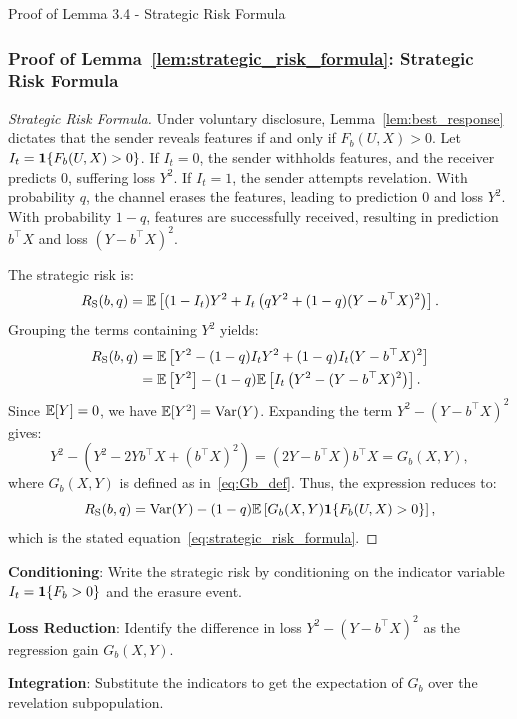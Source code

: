 \begin{sourceblock}{Proof of Lemma 3.4 - Strategic Risk Formula}
\subsubsection*{Proof of Lemma~\ref{lem:strategic_risk_formula}: Strategic Risk Formula}
\label{app:proof_strategic_risk}
\begin{proof}[Strategic Risk Formula]
Under voluntary disclosure, Lemma~\ref{lem:best_response} dictates that the sender reveals features if and only if $F_b(U, X) > 0$. 
Let $I_t = \mathbf{1}\{F_b(U, X) > 0\}$.
If $I_t = 0$, the sender withholds features, and the receiver predicts $0$, suffering loss $Y^2$. 
If $I_t = 1$, the sender attempts revelation. With probability $q$, the channel erases the features, leading to prediction $0$ and loss $Y^2$. With probability $1 - q$, features are successfully received, resulting in prediction $b^\top X$ and loss $(Y - b^\top X)^2$. 

The strategic risk is:
\begin{equation}
    R_{\mathrm{S}}(b, q) = \mathbb{E}\left[ (1 - I_t) Y^2 + I_t \left( q Y^2 + (1 - q)(Y - b^\top X)^2 \right) \right].
\end{equation}
Grouping the terms containing $Y^2$ yields:
\begin{align}
    R_{\mathrm{S}}(b, q) &= \mathbb{E}\left[ Y^2 - (1 - q)I_t Y^2 + (1 - q)I_t (Y - b^\top X)^2 \right] \nonumber \\
    &= \mathbb{E}\left[ Y^2 \right] - (1 - q) \mathbb{E}\left[ I_t \left( Y^2 - (Y - b^\top X)^2 \right) \right].
\end{align}
Since $\mathbb{E}[Y] = 0$, we have $\mathbb{E}[Y^2] = \mathrm{Var}(Y)$. Expanding the term $Y^2 - (Y - b^\top X)^2$ gives:
\begin{equation}
    Y^2 - (Y^2 - 2Y b^\top X + (b^\top X)^2) = (2Y - b^\top X)b^\top X = G_b(X, Y),
\end{equation}
where $G_b(X, Y)$ is defined as in~\eqref{eq:Gb_def}. Thus, the expression reduces to:
\begin{equation}
    R_{\mathrm{S}}(b, q) = \mathrm{Var}(Y) - (1 - q)\mathbb{E}\left[ G_b(X, Y) \mathbf{1}\{F_b(U, X) > 0\} \right],
\end{equation}
which is the stated equation~\eqref{eq:strategic_risk_formula}.
\end{proof}
\end{sourceblock}

\begin{guideblock}
\item \textbf{Conditioning}: Write the strategic risk by conditioning on the indicator variable $I_t = \mathbf{1}\{F_b > 0\}$ and the erasure event.
\item \textbf{Loss Reduction}: Identify the difference in loss $Y^2 - (Y - b^\top X)^2$ as the regression gain $G_b(X, Y)$.
\item \textbf{Integration}: Substitute the indicators to get the expectation of $G_b$ over the revelation subpopulation.
\end{guideblock}


